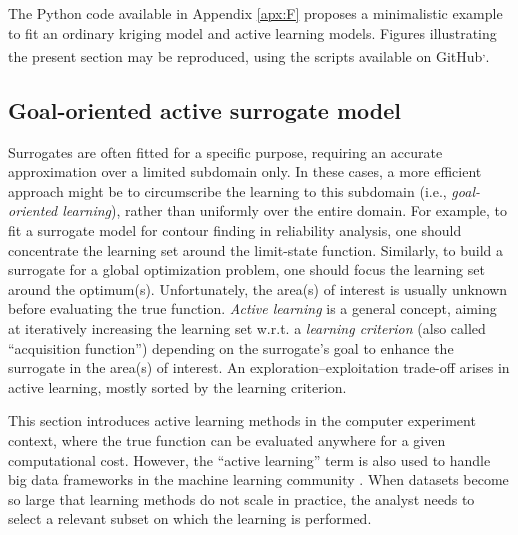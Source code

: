 \begin{otexample}
    The Python code available in Appendix \ref{apx:F} proposes a minimalistic \ot example to fit an ordinary kriging model and active learning models. 
    Figures illustrating the present section may be reproduced, using the \ot scripts available on GitHub\footnotemark[13]\textsuperscript{,}\footnotemark[14].  
\end{otexample}



\subsection{Goal-oriented active surrogate model}

Surrogates are often fitted for a specific purpose, requiring an accurate approximation over a limited subdomain only. 
In these cases, a more efficient approach might be to circumscribe the learning to this subdomain (i.e., \textit{goal-oriented learning}), rather than uniformly over the entire domain. 
For example, to fit a surrogate model for contour finding in reliability analysis, one should concentrate the learning set around the limit-state function. 
Similarly, to build a surrogate for a global optimization problem, one should focus the learning set around the optimum(s). 
Unfortunately, the area(s) of interest is usually unknown before evaluating the true function. 
\textit{Active learning} is a general concept, aiming at iteratively increasing the learning set w.r.t. a \textit{learning criterion} (also called ``acquisition function'') depending on the surrogate's goal to enhance the surrogate in the area(s) of interest. 
An exploration--exploitation trade-off arises in active learning, mostly sorted by the learning criterion.

\begin{remark}
    This section introduces active learning methods in the computer experiment context, where the true function can be evaluated anywhere for a given computational cost. 
    However, the ``active learning'' term is also used to handle big data frameworks in the machine learning community \citep{qiu_2016}. 
    When datasets become so large that learning methods do not scale in practice, the analyst needs to select a relevant subset on which the learning is performed.  
\end{remark}

